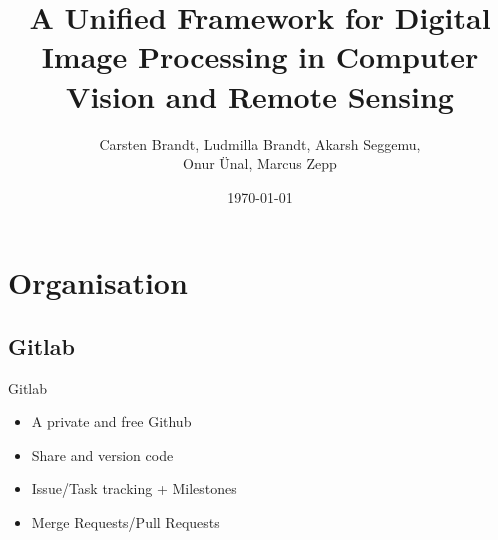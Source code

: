\documentclass{beamer}
\title{A Unified Framework for Digital Image Processing in Computer Vision and Remote Sensing}
\author{
Carsten Brandt,
Ludmilla Brandt,
Akarsh Seggemu,\\
Onur Ünal,
Marcus Zepp
}
\date{\today}
\begin{document}
\begin{frame}
	\titlepage
\end{frame}

\begin{frame}
	\tableofcontents  \pnote{}
\end{frame}


\section{Organisation}
\subsection{Gitlab}
\begin{frame}{Gitlab}

	\begin{itemize}
		\item A private and free Github \pause
		\item Share and version code \pause
		\item Issue/Task tracking + Milestones \pause
		\item Merge Requests/Pull Requests
	\end{itemize}

\end{frame}
\end{document}
